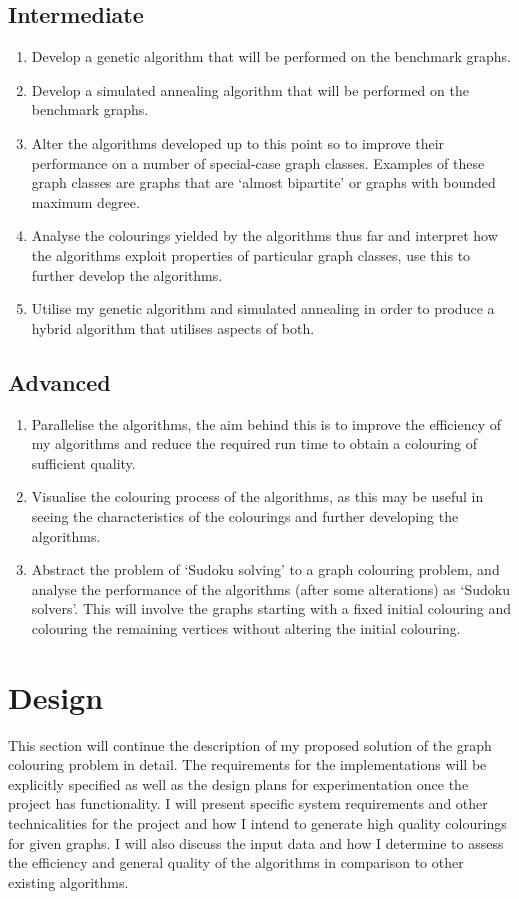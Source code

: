 \documentclass[12pt,a4paper]{article}
\begin{document}
\subsection*{Intermediate}
\begin{enumerate}[label = \textbf{I\arabic*}]
\itemsep0em
\item Develop a genetic algorithm that will be performed on the benchmark graphs.
\item Develop a simulated annealing algorithm that will be performed on the benchmark graphs.
\item Alter the algorithms developed up to this point so to improve their performance on a number of special-case graph classes. Examples of these graph classes are graphs that are  `almost bipartite' or graphs with bounded maximum degree.
\item  Analyse the colourings yielded by the algorithms thus far and interpret how the algorithms exploit properties of particular graph classes, use this to further develop the algorithms.
\item Utilise my genetic algorithm and simulated annealing in order to produce a hybrid algorithm that utilises aspects of both.
\end{enumerate}  

\subsection*{Advanced}
\begin{enumerate}[label = \textbf{A\arabic*}]
\itemsep0em
\item Parallelise the algorithms, the aim behind this is to improve the efficiency of my algorithms and reduce the required run time to obtain a colouring of sufficient quality.
\item Visualise the colouring process of the algorithms, as this may be useful in seeing the characteristics of the colourings and further developing the algorithms.
\item Abstract the problem of `Sudoku solving' to a graph colouring problem, and analyse the performance of the algorithms (after some alterations) as `Sudoku solvers'. This will involve the graphs starting with a fixed initial colouring and colouring the remaining vertices without altering the initial colouring.

\end{enumerate}

\newpage

\section{Design}
\noindent
This section will continue the description of my proposed solution of the graph colouring problem in detail. The requirements for the implementations will be explicitly specified as well as the design plans for experimentation once the project has functionality. I will present specific system requirements and other technicalities for the project and how I intend to generate high quality colourings for given graphs. I will also discuss the input data and how I determine to assess the efficiency and general quality of the algorithms in comparison to other existing algorithms.
\end{document}
